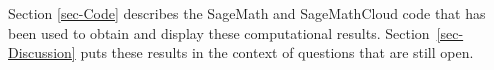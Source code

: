 \documentclass[12pt,a4paper]{article}
\begin{document}
Section \ref{sec-Code} describes the SageMath and SageMathCloud code that has been used to obtain
and display these computational results.
Section~\ref{sec-Discussion} puts these results in the context of questions that are still open.
%
%
%
%
%
%
%
%
%
%
%

\end{document}
